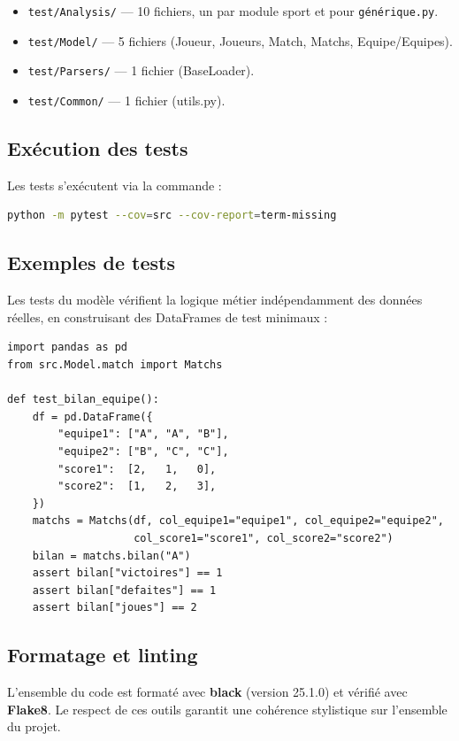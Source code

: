 \documentclass[12pt,a4paper]{article}
\newcommand{\fichier}[1]{\texttt{#1}}
\begin{document}
\begin{itemize}
  \item \fichier{test/Analysis/} --- 10 fichiers, un par module sport et
        pour \fichier{générique.py}.
  \item \fichier{test/Model/} --- 5 fichiers (Joueur, Joueurs, Match, Matchs,
        Equipe/Equipes).
  \item \fichier{test/Parsers/} --- 1 fichier (BaseLoader).
  \item \fichier{test/Common/} --- 1 fichier (utils.py).
\end{itemize}

\subsection{Exécution des tests}

Les tests s'exécutent via la commande :

\begin{lstlisting}[language=bash, numbers=none]
python -m pytest --cov=src --cov-report=term-missing
\end{lstlisting}

\subsection{Exemples de tests}

Les tests du modèle vérifient la logique métier indépendamment des données
réelles, en construisant des DataFrames de test minimaux :

\begin{lstlisting}[caption={Extrait de test pour la classe Matchs}]
import pandas as pd
from src.Model.match import Matchs

def test_bilan_equipe():
    df = pd.DataFrame({
        "equipe1": ["A", "A", "B"],
        "equipe2": ["B", "C", "C"],
        "score1":  [2,   1,   0],
        "score2":  [1,   2,   3],
    })
    matchs = Matchs(df, col_equipe1="equipe1", col_equipe2="equipe2",
                    col_score1="score1", col_score2="score2")
    bilan = matchs.bilan("A")
    assert bilan["victoires"] == 1
    assert bilan["defaites"] == 1
    assert bilan["joues"] == 2
\end{lstlisting}

\subsection{Formatage et linting}

L'ensemble du code est formaté avec \textbf{black} (version 25.1.0) et vérifié
avec \textbf{Flake8}. Le respect de ces outils garantit une cohérence stylistique
sur l'ensemble du projet.
\end{document}
